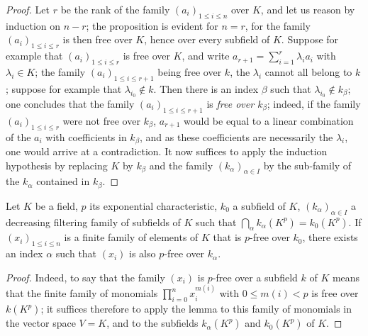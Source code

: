 \begin{proof}
Let $r$ be the rank of the family $(a_i)_{1\leqslant i\leqslant n}$ over $K$, and let us reason by induction on $n-r$; the proposition is evident for $n=r$, for the family $(a_i)_{1\leqslant i\leqslant r}$ is then free over $K$, hence over every subfield of $K$.
Suppose for example that $(a_i)_{1\leqslant i\leqslant r}$ is free over $K$, and write $a_{r+1}=\sum_{i=1}^r\lambda_i a_i$ with $\lambda_i\in K$; the family $(a_i)_{1\leqslant i\leqslant r+1}$ being free over $k$, the $\lambda_i$ cannot all belong to $k$; suppose for example that $\lambda_{i_0}\notin k$.
Then there is an index $\beta$ such that $\lambda_{i_0}\notin k_\beta$; one concludes that the family $(a_i)_{1\leqslant i\leqslant r+1}$ is \emph{free over $k_\beta$}; indeed, if the family $(a_i)_{1\leqslant i\leqslant r}$ were not free over $k_\beta$, $a_{r+1}$ would be equal to a linear combination of the $a_i$ with coefficients in $k_\beta$, and as these coefficients are necessarily the $\lambda_i$, one would arrive at a contradiction.
It now suffices to apply the induction hypothesis by replacing $K$ by $k_\beta$ and the family $(k_\alpha)_{\alpha\in I}$ by the sub-family of the $k_\alpha$ contained in $k_\beta$.
\end{proof}

\begin{lemma}[21.8.2]
\label{0.21.8.2}
Let $K$ be a field, $p$ its exponential characteristic, $k_0$ a subfield of $K$, $(k_\alpha)_{\alpha\in I}$ a decreasing filtering family of subfields of $K$ such that $\bigcap_\alpha k_\alpha(K^p)=k_0(K^p)$.
If $(x_i)_{1\leqslant i\leqslant n}$ is a finite family of elements of $K$ that is $p$-free over $k_0$, there exists an index $\alpha$ such that $(x_i)$ is also $p$-free over $k_\alpha$.
\end{lemma}

\begin{proof}
Indeed, to say that the family $(x_i)$ is $p$-free over a subfield $k$ of $K$ means that the finite family of monomials $\prod_{i=0}^n x_i^{m(i)}$ with $0\leqslant m(i)<p$ is free over $k(K^p)$; it suffices therefore to apply the lemma  to this family of monomials in the vector space $V=K$, and to the subfields $k_\alpha(K^p)$ and $k_0(K^p)$ of $K$.
\end{proof}

